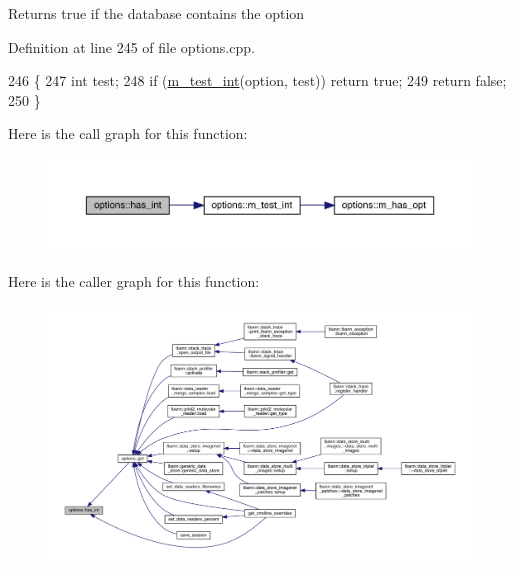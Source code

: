 Returns true if the database contains the option 

Definition at line 245 of file options.\+cpp.


\begin{DoxyCode}
246 \{
247   \textcolor{keywordtype}{int} test;
248   \textcolor{keywordflow}{if} (\hyperlink{classoptions_ad9b4461e633b73acc2fde7752ef60d41}{m\_test\_int}(option, test)) \textcolor{keywordflow}{return} \textcolor{keyword}{true};
249   \textcolor{keywordflow}{return} \textcolor{keyword}{false};
250 \}
\end{DoxyCode}
Here is the call graph for this function\+:\nopagebreak
\begin{figure}[H]
\begin{center}
\leavevmode
\includegraphics[width=350pt]{classoptions_a01020aa5bd82bcff1b1c950b20578883_cgraph}
\end{center}
\end{figure}
Here is the caller graph for this function\+:\nopagebreak
\begin{figure}[H]
\begin{center}
\leavevmode
\includegraphics[width=350pt]{classoptions_a01020aa5bd82bcff1b1c950b20578883_icgraph}
\end{center}
\end{figure}
\mbox{\label{classoptions_a5db5b27267c27ffe1b029948f64e54c1}} 
